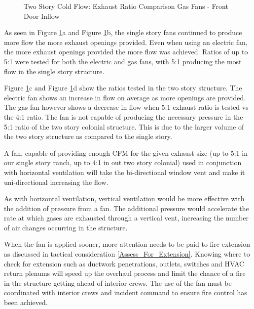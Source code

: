 \documentclass{article}
\begin{document}
\begin{figure}[H]
\begin{tabular}{*2c}
	\end{tabular}
	\caption{Two Story Cold Flow: Exhaust Ratio Comparison Gas Fans - Front Door Inflow}
	\label{fig:MoreFlowTC}
\end{figure}

As seen in Figure \ref{fig:MoreFlowTC}a and Figure \ref{fig:MoreFlowTC}b, the single story fans continued to produce more flow the more exhaust openings provided. Even when using an electric fan, the more exhaust openings provided the more flow was achieved. Ratios of up to 5:1 were tested for both the electric and gas fans, with 5:1 producing the most flow in the single story structure. 

Figure \ref{fig:MoreFlowTC}c and Figure \ref{fig:MoreFlowTC}d show the ratios tested in the two story structure. The electric fan shows an increase in flow on average as more openings are provided. The gas fan however shows a decrease in flow when 5:1 exhaust ratio is tested vs the 4:1 ratio. The fan is not capable of producing the necessary pressure in the 5:1 ratio of the two story colonial structure. This is due to the larger volume of the two story structure as compared to the single story.

A fan, capable of providing enough CFM for the given exhaust size (up to 5:1 in our single story ranch, up to 4:1 in out two story colonial) used in conjunction with horizontal ventilation will take the bi-directional window vent and make it uni-directional increasing the flow.

As with horizontal ventilation, vertical ventilation would be more effective with the addition of pressure from a fan. The additional pressure would accelerate the rate at which gases are exhausted through a vertical vent, increasing the number of air changes occurring in the structure.

When the fan is applied sooner, more attention needs to be paid to fire extension as discussed in tactical consideration \ref{Assess_For_Extension}. Knowing where to check for extension such as ductwork penetrations, outlets, switches and HVAC return plenums will speed up the overhaul process and limit the chance of a fire in the structure getting ahead of interior crews.  The use of the fan must be coordinated with interior crews and incident command to ensure fire control has been achieved.  
\end{document}
